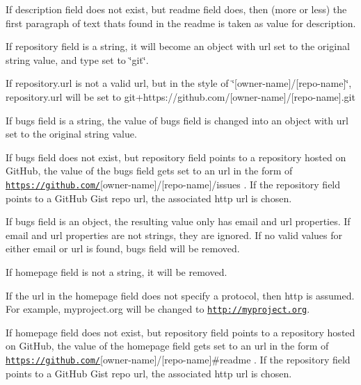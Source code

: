 \begin{DoxyItemize}
\item If {\ttfamily description} field does not exist, but {\ttfamily readme} field does, then (more or less) the first paragraph of text that\textquotesingle{}s found in the readme is taken as value for {\ttfamily description}.
\item If {\ttfamily repository} field is a string, it will become an object with {\ttfamily url} set to the original string value, and {\ttfamily type} set to {\ttfamily \char`\"{}git\char`\"{}}.
\item If {\ttfamily repository.\+url} is not a valid url, but in the style of \char`\"{}\mbox{[}owner-\/name\mbox{]}/\mbox{[}repo-\/name\mbox{]}\char`\"{}, {\ttfamily repository.\+url} will be set to git+https\+://github.com/\mbox{[}owner-\/name\mbox{]}/\mbox{[}repo-\/name\mbox{]}.git
\item If {\ttfamily bugs} field is a string, the value of {\ttfamily bugs} field is changed into an object with {\ttfamily url} set to the original string value.
\item If {\ttfamily bugs} field does not exist, but {\ttfamily repository} field points to a repository hosted on Git\+Hub, the value of the {\ttfamily bugs} field gets set to an url in the form of \href{https://github.com/}{\tt https\+://github.\+com/}\mbox{[}owner-\/name\mbox{]}/\mbox{[}repo-\/name\mbox{]}/issues . If the repository field points to a Git\+Hub Gist repo url, the associated http url is chosen.
\item If {\ttfamily bugs} field is an object, the resulting value only has email and url properties. If email and url properties are not strings, they are ignored. If no valid values for either email or url is found, bugs field will be removed.
\item If {\ttfamily homepage} field is not a string, it will be removed.
\item If the url in the {\ttfamily homepage} field does not specify a protocol, then http is assumed. For example, {\ttfamily myproject.\+org} will be changed to {\ttfamily \href{http://myproject.org}{\tt http\+://myproject.\+org}}.
\item If {\ttfamily homepage} field does not exist, but {\ttfamily repository} field points to a repository hosted on Git\+Hub, the value of the {\ttfamily homepage} field gets set to an url in the form of \href{https://github.com/}{\tt https\+://github.\+com/}\mbox{[}owner-\/name\mbox{]}/\mbox{[}repo-\/name\mbox{]}\#readme . If the repository field points to a Git\+Hub Gist repo url, the associated http url is chosen.
\end{DoxyItemize}

